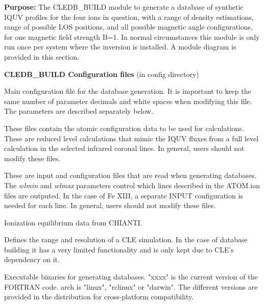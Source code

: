 \documentclass{article}
\begin{document}
\textbf{Purpose:} The CLEDB\_BUILD module to generate a database of synthetic IQUV profiles for the four ions in question, with a range of density estimations, range of possible LOS positions, and all possible magnetic angle configurations, for one magnetic field strength B=1.  In normal circumstances this module is only run once per system where the inversion is installed. A module diagram is provided in this section.

\textbf{CLEDB\_BUILD Configuration files} (in config directory)
\begin{description}
    [font=\normalfont,leftmargin=1.3in,style=multiline]
	\item[DB.INPUT]
	Main configuration file for the database generation. It is important to keep the same number of parameter decimals and white spaces when modifying this file. The parameters are described separately below. 
    \item[ATOM.ion]
    	These files contain the atomic configuration data to be used for calculations. These are reduced level calculations that mimic the IQUV fluxes from a full level calculation in the selected infrared coronal lines. In general, users should not modify these files.
	\item[INPUT.ion(a/b)]
	These are input and configuration files that are read when generating databases. The \emph{wlmin} and \emph{wlmax} parameters control which lines described in the ATOM.ion files are outputed. In the case of Fe XIII, a separate INPUT configuration is needed for each line. In general, users should not modify these files.   
	\item[IONEQ]
	Ionization equilibrium data from CHIANTI.
	\item[GRID.DAT]
	Defines the range and resolution of a CLE simulation. In the case of database building it has a very limited functionality and is only kept due to CLE's dependency on it.
	\item[db"xxxx"\_"arch"]
	Executable binaries for generating databases. "xxxx" is the current version of the FORTRAN code. arch is "linux", "rclinux" or "darwin". The different versions are provided in the distribution for cross-platform compatibility.	
\end{description}
    
\end{document}
